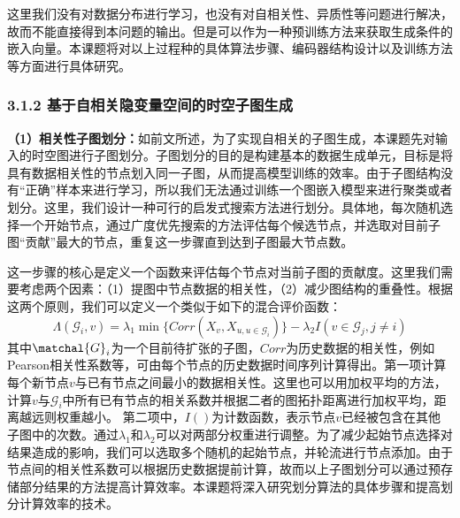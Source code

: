 \documentclass[12pt,UTF8,AutoFakeBold=2,a4paper]{ctexart} %
\begin{document}
这里我们没有对数据分布进行学习，也没有对自相关性、异质性等问题进行解决，故而不能直接得到本问题的输出。但是可以作为一种预训练方法来获取生成条件的嵌入向量。本课题将对以上过程种的具体算法步骤、编码器结构设计以及训练方法等方面进行具体研究。

\subsubsection{3.1.2 基于自相关隐变量空间的时空子图生成}
\textbf{（1）相关性子图划分：}如前文所述，为了实现自相关的子图生成，本课题先对输入的时空图进行子图划分。子图划分的目的是构建基本的数据生成单元，目标是将具有数据相关性的节点划入同一子图，从而提高模型训练的效率。由于子图结构没有``正确''样本来进行学习，所以我们无法通过训练一个图嵌入模型来进行聚类或者划分。这里，我们设计一种可行的启发式搜索方法进行划分。具体地，每次随机选择一个开始节点，通过广度优先搜索的方法评估每个候选节点，并选取对目前子图``贡献''最大的节点，重复这一步骤直到达到子图最大节点数。

这一步骤的核心是定义一个函数来评估每个节点对当前子图的贡献度。这里我们需要考虑两个因素：（1）提图中节点数据的相关性，（2）减少图结构的重叠性。根据这两个原则，我们可以定义一个类似于如下的混合评价函数：
\begin{equation}
    \Lambda(\mathcal{G}_i, v) = \lambda_1 \min  \{Corr(X_v, X_{u,u\in\mathcal{G}_i})\}-\lambda_2 I(v\in \mathcal{G}_j,j\ne i)
\end{equation}
其中$\matchal{G}_i$为一个目前待扩张的子图，$Corr$为历史数据的相关性，例如Pearson相关性系数等，可由每个节点的历史数据时间序列计算得出。第一项计算每个新节点$v$与已有节点之间最小的数据相关性。这里也可以用加权平均的方法，计算$v$与$\mathcal{G}_i$中所有已有节点的相关系数并根据二者的图拓扑距离进行加权平均，距离越远则权重越小。
第二项中，$I()$为计数函数，表示节点$v$已经被包含在其他子图中的次数。通过$\lambda_1$和$\lambda_2$可以对两部分权重进行调整。为了减少起始节点选择对结果造成的影响，我们可以选取多个随机的起始节点，并轮流进行节点添加。由于节点间的相关性系数可以根据历史数据提前计算，故而以上子图划分可以通过预存储部分结果的方法提高计算效率。本课题将深入研究划分算法的具体步骤和提高划分计算效率的技术。
\end{document}
